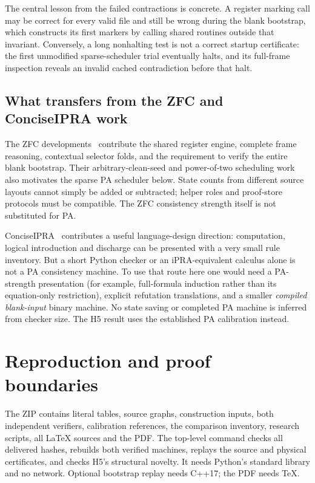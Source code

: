 \documentclass[11pt]{article}
\theoremstyle{definition}\newtheorem{definition}[theorem]{Definition}
\newcommand{\file}[1]{\path{#1}}
\begin{document}
The central lesson from the failed contractions is concrete. A register
marking call may be correct for every valid file and still be wrong during
the blank bootstrap, which constructs its first markers by calling shared
routines outside that invariant. Conversely, a long nonhalting test is
not a correct startup certificate: the first unmodified sparse-scheduler
trial eventually halts, and its full-frame inspection reveals an invalid
cached contradiction before that halt.

\subsection{What transfers from the ZFC and ConciseIPRA work}

The ZFC developments~\cite{zfc} contribute the shared register engine, complete
frame reasoning, contextual selector folds, and the requirement to
verify the entire blank bootstrap. Their arbitrary-clean-seed and
power-of-two scheduling work also motivates the sparse PA scheduler
below. State counts from different source layouts cannot simply be added
or subtracted; helper roles and proof-store protocols must be compatible.
The ZFC consistency strength itself is not substituted for PA.

ConciseIPRA~\cite{ipra} contributes a useful language-design direction: computation,
logical introduction and discharge can be presented with a very small
rule inventory. But a short Python checker or an iPRA-equivalent calculus
alone is not a PA consistency machine. To use that route here one would
need a PA-strength presentation (for example, full-formula induction
rather than its equation-only restriction), explicit refutation
translations, and a smaller \emph{compiled blank-input} binary machine.
No state saving or completed PA machine is inferred from checker size.
The H5 result uses the established PA calibration instead.




\section{Reproduction and proof boundaries}

The ZIP contains literal tables, source graphs, construction inputs, both
independent verifiers, calibration references, the comparison inventory,
research scripts, all \LaTeX{} sources and the PDF. The top-level command
\file{python3 reproduce.py} checks all delivered hashes, rebuilds both
verified machines, replays the source and physical certificates, and
checks H5's structural novelty. It needs Python's standard library and no
network. Optional bootstrap replay needs C++17; the PDF needs \TeX.
\end{document}
